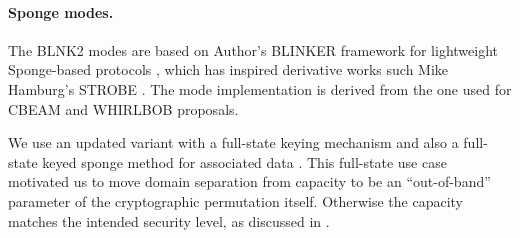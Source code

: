\documentclass{iacrtrans}
\begin{document}
	\paragraph{Sponge modes.}
	The BLNK2 modes are based on Author's BLINKER framework for 
	lightweight Sponge-based protocols \cite{DBLP:conf/ctrsa/Saarinen14a}, 
	which has inspired derivative works such Mike Hamburg's STROBE 
	\cite{DBLP:journals/iacr/Hamburg17}. The mode implementation is derived
	from the one used for CBEAM \cite{DBLP:conf/ctrsa/Saarinen14} and 
	WHIRLBOB \cite{DBLP:conf/nordsec/SaarinenB15} proposals.

	We use an updated variant with a full-state keying mechanism and
	also a full-state keyed sponge method for associated data 
	\cite{DBLP:conf/crypto/GaziPT15,DBLP:conf/asiacrypt/MenninkRV15}.
	This full-state use case motivated us to move domain separation 
	from capacity to be an ``out-of-band'' parameter of the cryptographic 
	permutation itself.
	Otherwise the capacity matches the intended security level, as 
	discussed in \cite{DBLP:conf/asiacrypt/JovanovicLM14}.





\end{document}
